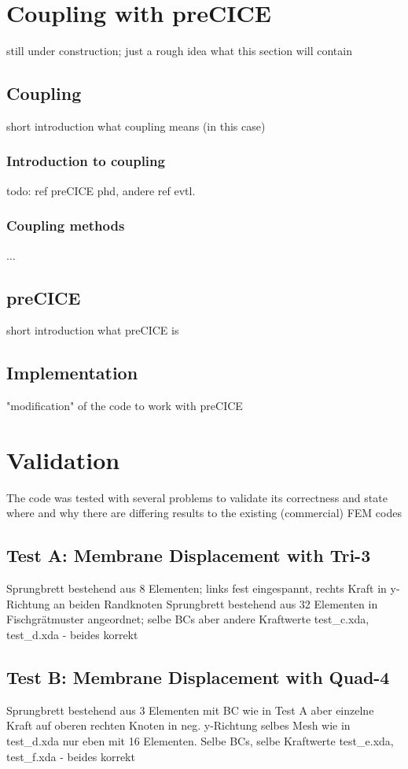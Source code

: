 \documentclass[11pt,twoside]{scrartcl}
\begin{document}
\section{Coupling with preCICE}
still under construction; just a rough idea what this section will contain
 \subsection{Coupling}
 short introduction what coupling means (in this case)
  \subsubsection{Introduction to coupling}
  todo: ref preCICE phd, andere ref evtl.
  \subsubsection{Coupling methods}
  $\dots$
 \subsection{preCICE}
 short introduction what preCICE is
 \subsection{Implementation}
 "modification" of the code to work with preCICE
\newpage
\section{Validation}
The code was tested with several problems to validate its correctness and state where and why there are differing results to the existing (commercial) FEM codes
 \subsection{Test A: Membrane Displacement with Tri-3}
 Sprungbrett bestehend aus 8 Elementen; links fest eingespannt, rechts Kraft in y-Richtung an beiden Randknoten\newline
 Sprungbrett bestehend aus 32 Elementen in Fischgrätmuster angeordnet; selbe BCs aber andere Kraftwerte\newline
 test\_c.xda, test\_d.xda - beides korrekt
 \subsection{Test B: Membrane Displacement with Quad-4}
 Sprungbrett bestehend aus 3 Elementen mit BC wie in Test A aber einzelne Kraft auf oberen rechten Knoten in neg. y-Richtung\newline
 selbes Mesh wie in test\_d.xda nur eben mit 16 Elementen. Selbe BCs, selbe Kraftwerte\newline
 test\_e.xda, test\_f.xda - beides korrekt
\end{document}
